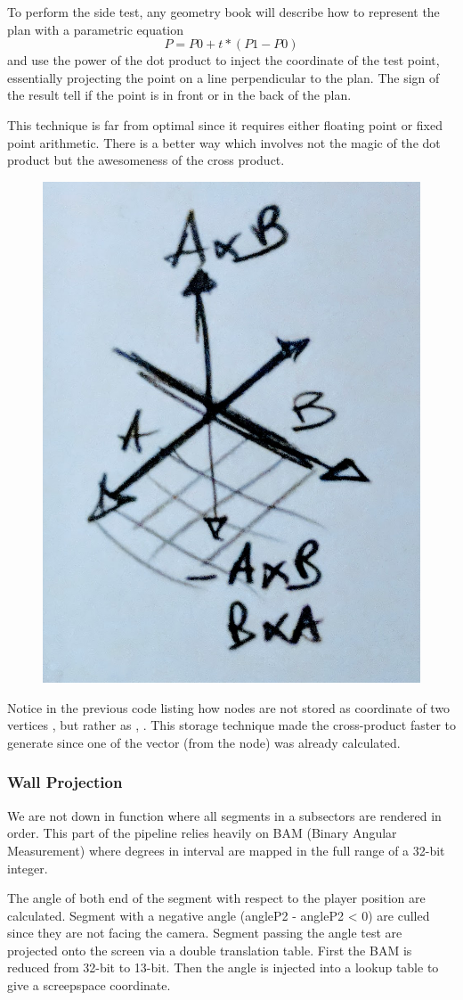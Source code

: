 To perform the side test, any geometry book will describe how to represent the plan with a parametric equation $$ P = P0 + t * (P1 - P0) $$
and use the power of the dot product to inject the coordinate of the test point, essentially projecting the point on a line perpendicular to the plan. The sign of the result tell if the point is in front or in the back of the plan.\\
\par
This technique is far from optimal since it requires either floating point or fixed point arithmetic. There is a better way which involves not the magic of the dot product but the awesomeness of the cross product.\\
\par
{}
\pagebreak


\begin{figure}
\centering
\includegraphics[width=.25\textwidth]{drawings/line_cross_product.png}
\end{figure}
Notice in the previous code listing how nodes are not stored as coordinate of two vertices ,  but rather as , . This storage technique made the cross-product faster to generate since one of the vector (from the node) was already calculated.\\
\par


\subsubsection{Wall Projection}
We are not down in  function where all segments in a subsectors are rendered in order. This part of the pipeline relies heavily on BAM (Binary Angular Measurement) where degrees in interval \cw{[0, 360]} are mapped in the full range of a 32-bit integer.\\
\par
{}
\par
The angle of both end of the segment with respect to the player position are calculated. Segment with a negative angle (angleP2 - angleP2 < 0) are culled since they are not facing the camera. Segment passing the angle test are projected onto the screen via a double translation table. First the BAM is reduced from 32-bit to 13-bit. Then the angle is injected into a lookup table  to give a screepspace  coordinate.\\
 \par

